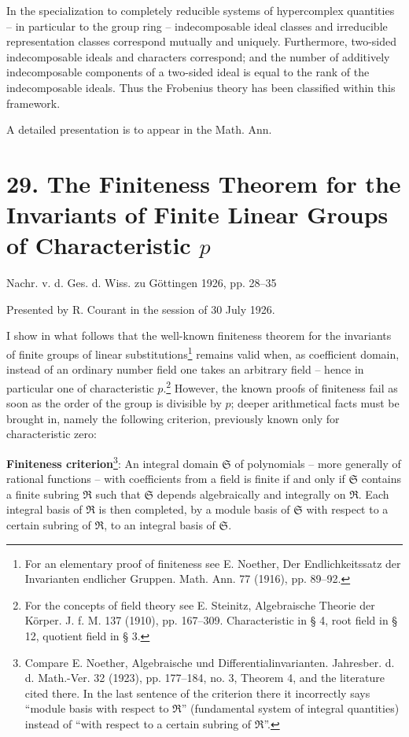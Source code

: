 \documentclass[11pt]{article}
\begin{document}
In the specialization to completely reducible systems of hypercomplex quantities -- in particular to the group ring -- indecomposable ideal classes and irreducible representation classes correspond mutually and uniquely. Furthermore, two-sided indecomposable ideals and characters correspond; and the number of additively indecomposable components of a two-sided ideal is equal to the rank of the indecomposable ideals. Thus the Frobenius theory has been classified within this framework.

A detailed presentation is to appear in the Math. Ann.

\section*{29. The Finiteness Theorem for the Invariants of Finite Linear Groups of Characteristic $p$}

\begin{center}
Nachr. v. d. Ges. d. Wiss. zu Göttingen 1926, pp. 28--35
\end{center}

Presented by R. Courant in the session of 30 July 1926.

I show in what follows that the well-known finiteness theorem for the invariants of finite groups of linear substitutions\footnote{For an elementary proof of finiteness see E. Noether, Der Endlichkeitssatz der Invarianten endlicher Gruppen. Math. Ann. 77 (1916), pp. 89--92.} remains valid when, as coefficient domain, instead of an ordinary number field one takes an arbitrary field -- hence in particular one of characteristic $p$.\footnote{For the concepts of field theory see E. Steinitz, Algebraische Theorie der Körper. J. f. M. 137 (1910), pp. 167--309. Characteristic in § 4, root field in § 12, quotient field in § 3.} However, the known proofs of finiteness fail as soon as the order of the group is divisible by $p$; deeper arithmetical facts must be brought in, namely the following criterion, previously known only for characteristic zero:

\textbf{Finiteness criterion}\footnote{Compare E. Noether, Algebraische und Differentialinvarianten. Jahresber. d. d. Math.-Ver. 32 (1923), pp. 177--184, no. 3, Theorem 4, and the literature cited there. In the last sentence of the criterion there it incorrectly says ``module basis with respect to $\mathfrak R$'' (fundamental system of integral quantities) instead of ``with respect to a certain subring of $\mathfrak R$''.}: An integral domain $\mathfrak S$ of polynomials -- more generally of rational functions -- with coefficients from a field is finite if and only if $\mathfrak S$ contains a finite subring $\mathfrak R$ such that $\mathfrak S$ depends algebraically and integrally on $\mathfrak R$. Each integral basis of $\mathfrak R$ is then completed, by a module basis of $\mathfrak S$ with respect to a certain subring of $\mathfrak R$, to an integral basis of $\mathfrak S$.
\end{document}
